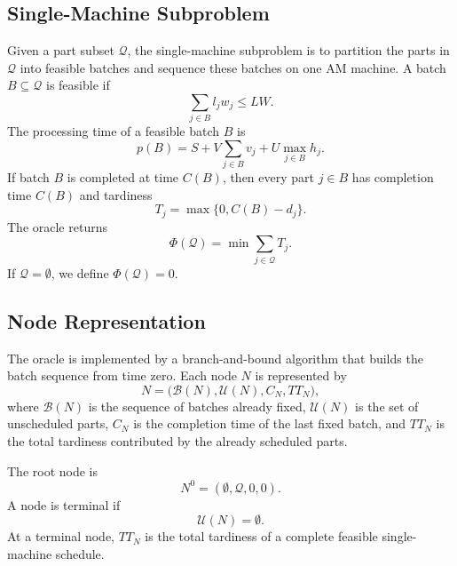 \documentclass[review,3p,times,authoryear]{elsarticle}
\begin{document}
\subsection{Single-Machine Subproblem}

Given a part subset $\mathcal{Q}$, the single-machine subproblem is to
partition the parts in $\mathcal{Q}$ into feasible batches and sequence
these batches on one AM machine. A batch $B\subseteq \mathcal{Q}$ is feasible
if
\begin{equation}
	\sum_{j\in B} l_j w_j \le LW.
\end{equation}
The processing time of a feasible batch $B$ is
\begin{equation}
	p(B)
	=
	S
	+
	V\sum_{j\in B}v_j
	+
	U\max_{j\in B}h_j .
	\label{eq:oracle_batch_processing_time}
\end{equation}
If batch $B$ is completed at time $C(B)$, then every part $j\in B$ has
completion time $C(B)$ and tardiness
\begin{equation}
	T_j=\max\{0,C(B)-d_j\}.
\end{equation}
The oracle returns
\begin{equation}
	\Phi(\mathcal{Q})
	=
	\min
	\sum_{j\in \mathcal{Q}} T_j .
\end{equation}
If $\mathcal{Q}=\emptyset$, we define $\Phi(\mathcal{Q})=0$.

\subsection{Node Representation}

The oracle is implemented by a branch-and-bound algorithm that builds the
batch sequence from time zero. Each node $N$ is represented by
\begin{equation}
	N=
	\bigl(
	\mathcal{B}(N),\mathcal{U}(N),C_N,TT_N
	\bigr),
\end{equation}
where $\mathcal{B}(N)$ is the sequence of batches already fixed,
$\mathcal{U}(N)$ is the set of unscheduled parts, $C_N$ is the completion
time of the last fixed batch, and $TT_N$ is the total tardiness contributed
by the already scheduled parts.

The root node is
\begin{equation}
	N^0=(\emptyset,\mathcal{Q},0,0).
\end{equation}
A node is terminal if
\begin{equation}
	\mathcal{U}(N)=\emptyset .
\end{equation}
At a terminal node, $TT_N$ is the total tardiness of a complete feasible
single-machine schedule.
\end{document}
